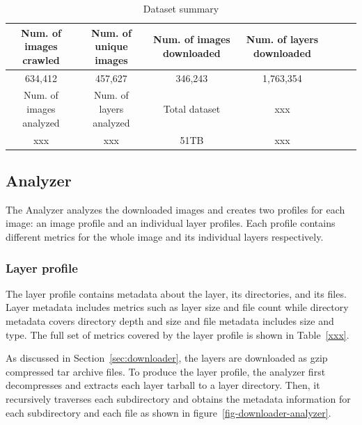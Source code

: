 \begin{table}
	\centering
	\caption{Dataset summary} \label{tab-dataset-summary}
	\begin{tabular}{c|c|c|c|c|c|c}%
		\hline
		Num. of images crawled & Num. of unique images    & Num. of images downloaded  & Num. of layers downloaded \\
		\hline
		634,412                 & 457,627                 & 346,243                    & 1,763,354  \\
		\hline
		Num. of images analyzed & Num. of layers analyzed & Total dataset              &  xxx \\
		\hline
		xxx                     & xxx                     & 51TB                        & xxx  \\
		\hline
	\end{tabular}
\end{table}

\subsection{Analyzer}
\label{sec:analyzer}

The Analyzer analyzes the downloaded images and creates two profiles
for each image: an image profile and an individual layer profiles.
Each profile contains different metrics for the whole image and
its individual layers respectively.
%
%

\subsubsection{Layer profile}

The layer profile contains metadata about the layer, its directories,
and its files. Layer metadata includes metrics such as layer size and
file count while directory metadata covers directory depth and size
and file metadata includes size and type. The full set of metrics
covered by the layer profile is shown in Table~\ref{xxx}.


As discussed in Section~\ref{sec:downloader}, the layers are downloaded
as gzip compressed tar archive files.
%
To produce the layer profile, the analyzer first decompresses and extracts each
layer tarball to a layer directory.
%
Then, it recursively traverses each subdirectory and obtains
the metadata information for each subdirectory and each file as shown
in figure~\ref{fig-downloader-analyzer}.


